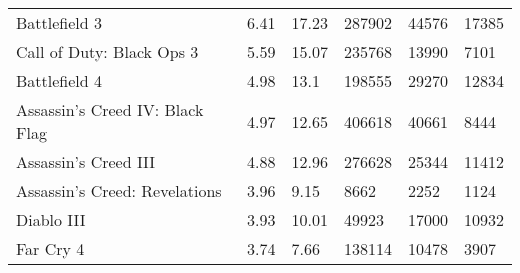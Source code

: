 \begin{table*}[]
\begin{tabular}{llllll}
\multicolumn{1}{l|}{Battlefield 3}                   & 6.41            & 17.23          & 287902                & 44576                                                                            & 17385                                                                           \\
\multicolumn{1}{l|}{Call of Duty: Black Ops 3}       & 5.59            & 15.07          & 235768                & 13990                                                                            & 7101                                                                            \\
\multicolumn{1}{l|}{Battlefield 4}                   & 4.98            & 13.1           & 198555                & 29270                                                                            & 12834                                                                           \\
\multicolumn{1}{l|}{Assassin's Creed IV: Black Flag} & 4.97            & 12.65          & 406618                & 40661                                                                            & 8444                                                                            \\
\multicolumn{1}{l|}{Assassin's Creed III}            & 4.88            & 12.96          & 276628                & 25344                                                                            & 11412                                                                           \\
\multicolumn{1}{l|}{Assassin's Creed: Revelations}   & 3.96            & 9.15           & 8662                  & 2252                                                                             & 1124                                                                            \\
\multicolumn{1}{l|}{Diablo III}                      & 3.93            & 10.01          & 49923                 & 17000                                                                            & 10932                                                                           \\
\multicolumn{1}{l|}{Far Cry 4}                       & 3.74            & 7.66           & 138114                & 10478                                                                            & 3907                                                                           
\end{tabular}
\end{table*}